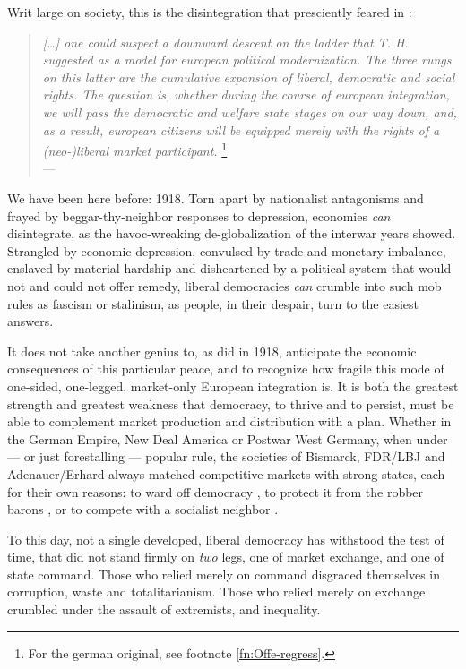 \documentclass[11pt,a4paper,oneside,openright]{article}
\begin{document}
Writ large on society, this is the disintegration that \citeauthor{Offe1998} presciently feared in \citeyear{Offe1998}:
\begin{quote}
	\emph{[\ldots] one could suspect a downward descent on the ladder that T. H. \cite{Marshall-1950-aa} suggested as a model for european political modernization. 
	The three rungs on this latter are the cumulative expansion of liberal, democratic and social rights. 
	The question is, whether during the course of european integration, we will pass the democratic and welfare state stages on our way down, and, as a result, european citizens will be equipped merely with the rights of a (neo-)liberal market participant.}
	\footnote{
		For the german original, see footnote \ref{fn:Offe-regress}.
	}\\
	--- \cite[41]{Offe1998}
\end{quote}

We have been here before: 
1918. 
Torn apart by nationalist antagonisms and frayed by beggar-thy-neighbor responses to depression, economies \emph{can} disintegrate, as the havoc-wreaking de-globalization of the interwar years showed. 
Strangled by economic depression, convulsed by trade and monetary imbalance, enslaved by material hardship and disheartened by a political system that would not and could not offer remedy, liberal democracies \emph{can} crumble into such mob rules as fascism or stalinism, as people, in their despair, turn to the easiest answers.

It does not take another genius to, as \cite{Keynes1936} did in 1918, anticipate the economic consequences of this particular peace, and to recognize how fragile this mode of one-sided, one-legged, market-only European integration is. 
It is both the greatest strength and greatest weakness that democracy, to thrive and to persist, must be able to complement market production and distribution with a plan. 
Whether in the German Empire, New Deal America or  Postwar West Germany, when under --- or just forestalling --- popular rule, the societies of Bismarck, FDR/LBJ and Adenauer/Erhard always matched competitive markets with strong states, each for their own reasons: 
to ward off democracy \citep{Leibfried}, to protect it from the robber barons \citep{Wapshott2011}, or to compete with a socialist neighbor \citep{Judt2006}.

To this day, not a single developed, liberal democracy has withstood the test of time, that did not stand firmly on \emph{two} legs, one of market exchange, and one of state command. 
Those who relied merely on command disgraced themselves in corruption, waste and totalitarianism. 
Those who relied merely on exchange crumbled under the assault of extremists, and inequality. 
\end{document}
